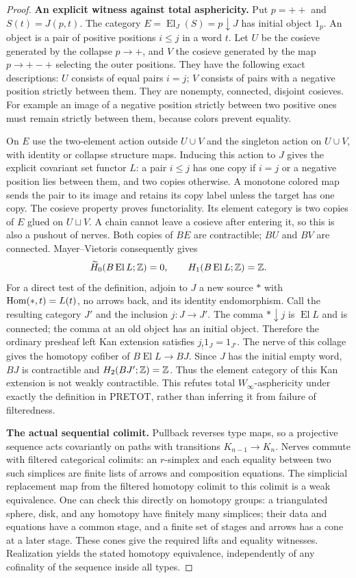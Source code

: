 \begin{proof}
\textbf{An explicit witness against total asphericity.} Put $p=++$
and $S(t)=J(p,t)$. The category $E=\operatorname{El}_J(S)=p\downarrow J$
has initial object $1_p$. An object is a pair of positive positions
$i\leq j$ in a word $t$. Let $U$ be the cosieve generated by the
collapse $p\to+$, and $V$ the cosieve generated by the map
$p\to+-+$ selecting the outer positions. They have the following
exact descriptions: $U$ consists of equal pairs $i=j$; $V$ consists
of pairs with a negative position strictly between them. They are
nonempty, connected, disjoint cosieves. For example an image of a
negative position strictly between two positive ones must remain
strictly between them, because colors prevent equality.

On $E$ use the two-element action outside $U\cup V$ and the singleton
action on $U\cup V$, with identity or collapse structure maps. Inducing
this action to $J$ gives the explicit covariant set functor $L$: a pair
$i\leq j$ has one copy if $i=j$ or a negative position lies between
them, and two copies otherwise. A monotone colored map sends the pair
to its image and retains its copy label unless the target has one
copy. The cosieve property proves functoriality. Its element category
is two copies of $E$ glued on $U\sqcup V$. A chain cannot leave a
cosieve after entering it, so this is also a pushout of nerves.
Both copies of $BE$ are contractible; $BU$ and $BV$ are connected.
Mayer--Vietoris consequently gives
\[
 \widetilde H_0(B\operatorname{El}L;\mathbb Z)=0,
 \qquad H_1(B\operatorname{El}L;\mathbb Z)=\mathbb Z.
\]
For a direct test of the definition, adjoin to $J$ a new source $*$
with $\operatorname{Hom}(*,t)=L(t)$, no arrows back, and its identity endomorphism.
Call the resulting category $J'$ and the inclusion $j:J\to J'$.
The comma $*\downarrow j$ is $\operatorname{El}L$ and is connected;
the comma at an old object has an initial object. Therefore the
ordinary presheaf left Kan extension satisfies $j_!1_J=1_{J'}$.
The nerve of this collage gives the homotopy cofiber of
$B\operatorname{El}L\to BJ$. Since $J$ has the initial empty word,
$BJ$ is contractible and $H_2(BJ';\mathbb Z)=\mathbb Z$. Thus the element category
of this Kan extension is not weakly contractible. This refutes total
$W_\infty$-asphericity under exactly the definition in
\textsc{PRETOT}, rather than inferring it from failure of filteredness.

\textbf{The actual sequential colimit.} Pullback reverses type maps,
so a projective sequence acts covariantly on paths with transitions
$K_{n-1}\to K_n$. Nerves commute with filtered categorical colimits:
an $r$-simplex and each equality between two such simplices are finite
lists of arrows and composition equations. The simplicial replacement
map from the filtered homotopy colimit to this colimit is a weak
equivalence. One can check this directly on homotopy groups: a
triangulated sphere, disk, and any homotopy have finitely many simplices;
their data and equations have a common stage, and a finite set of
stages and arrows has a cone at a later stage. These cones give the
required lifts and equality witnesses. Realization yields the stated
homotopy equivalence, independently of any cofinality of the sequence
inside all types.


\end{proof}
